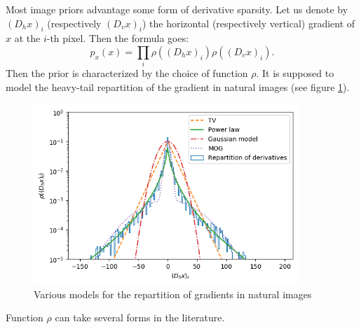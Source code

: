 \documentclass[english,a4paper]{article}
\theoremstyle{plain}
\theoremstyle{definition}
\theoremstyle{remark}
\begin{document}
Most image priors advantage some form of derivative sparsity\cite{krishnan2009fast, levin2009understanding, levin2011efficient, fergus2006removing}.
Let us denote by $(D_h x)_i$ (respectively $(D_v x)_i$) the horizontal (respectively vertical) gradient of $x$ at the $i$-th pixel. Then the formula goes:
\begin{equation}\label{eq:p_x_general}
p_x(x) = \prod_i \rho((D_h x)_i) \rho((D_v x)_i) .
\end{equation}
Then the prior is characterized by the choice of function $\rho$.
It is supposed to model the heavy-tail repartition of the gradient in natural images \cite{levi2009using} (see figure \ref{fig:heavytail}).
\begin{figure}
	\centering
	\includegraphics[width=10cm]{images/graph_derivatives}
	\caption{Various models for the repartition of gradients in natural images}
	\label{fig:heavytail}
\end{figure}
Function $\rho$ can take several forms in the literature.
\end{document}
